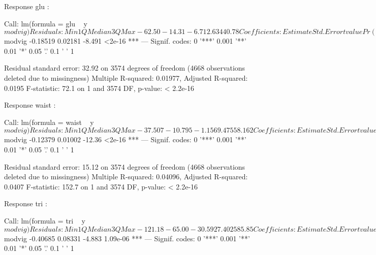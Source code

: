 \documentclass[11pt]{article}
\begin{document}
\begin{Schunk}
\begin{Soutput}
Response glu :

Call:
lm(formula = glu ~ y$modvig)

Residuals:
   Min     1Q Median     3Q    Max 
-62.50 -14.31  -6.71   2.63 440.78 

Coefficients:
             Estimate Std. Error t value Pr(>|t|)    
(Intercept) 107.87227    0.74640 144.524   <2e-16 ***
y$modvig     -0.18519    0.02181  -8.491   <2e-16 ***
---
Signif. codes:  0 '***' 0.001 '**' 0.01 '*' 0.05 '.' 0.1 ' ' 1

Residual standard error: 32.92 on 3574 degrees of freedom
  (4668 observations deleted due to missingness)
Multiple R-squared:  0.01977,	Adjusted R-squared:  0.0195 
F-statistic:  72.1 on 1 and 3574 DF,  p-value: < 2.2e-16


Response waist :

Call:
lm(formula = waist ~ y$modvig)

Residuals:
    Min      1Q  Median      3Q     Max 
-37.507 -10.795  -1.156   9.475  58.162 

Coefficients:
             Estimate Std. Error t value Pr(>|t|)    
(Intercept) 100.19115    0.34288  292.20   <2e-16 ***
y$modvig     -0.12379    0.01002  -12.36   <2e-16 ***
---
Signif. codes:  0 '***' 0.001 '**' 0.01 '*' 0.05 '.' 0.1 ' ' 1

Residual standard error: 15.12 on 3574 degrees of freedom
  (4668 observations deleted due to missingness)
Multiple R-squared:  0.04096,	Adjusted R-squared:  0.0407 
F-statistic: 152.7 on 1 and 3574 DF,  p-value: < 2.2e-16


Response tri :

Call:
lm(formula = tri ~ y$modvig)

Residuals:
    Min      1Q  Median      3Q     Max 
-121.18  -65.00  -30.59   27.40 2585.85 

Coefficients:
             Estimate Std. Error t value Pr(>|t|)    
(Intercept) 154.32305    2.85134  54.123  < 2e-16 ***
y$modvig     -0.40685    0.08331  -4.883 1.09e-06 ***
---
Signif. codes:  0 '***' 0.001 '**' 0.01 '*' 0.05 '.' 0.1 ' ' 1


\end{Soutput}
\end{Schunk}
\end{document}
